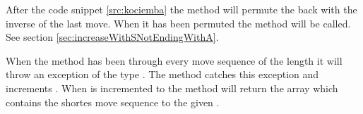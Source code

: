 After the code snippet \ref{src:kociemba} the method will permute the \rubik{} back with the inverse of the last move. When it has been permuted the method  will be called. See section \ref{sec:increaseWithSNotEndingWithA}.

When the method  has been through every move sequence of the length  it will throw an exception of the type  
. The  method catches this exception and increments . When  is incremented to  the method will return the  array which contains the shortes move sequence to the given \rubik{}.  

\begin{comment}
Thereafter it tests if \vr{d + c.length} > \vr{l}. 
If that is true, \vr{l} will be set equal to the sum of \vr{d + c.length} and the \vr{result} array will be initialized with the size \vr{l}. 
In the \vr{result} array the move sequence \vr{b} and the move sequence \vr{c} is added and the console will print the current \vr{result} and the time it took in seconds.

After the method has tested if \vr{d + c.length < l} the method will permute the \rubik{} back with the inverse of the last move. When it has been permuted the method \vr{increaseWithSNotEndingWithA} will be called. See section \ref{sec:increaseWithSNotEndingWithA}.

When the method \vr{increaseWithSNotEndingWithA} throws an exception of the type \vr{UnableToIncreaseMoveSequenceException} the method increments \vr{d}. 
When \vr{d} is incremented to \vr{l} the method will return the \vr{result} array.
\end{comment}